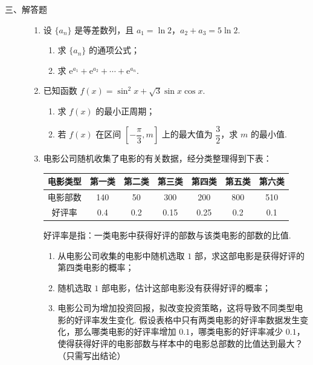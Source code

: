 \begin{description}

    \item[三、解答题]

    \begin{enumerate}[leftmargin=5pt]

      \addtocounter{enumi}{+14}

        \item 设 \(\{a_n\}\) 是等差数列，且 \(a_1=\ln2\)，\(a_2+a_3=5\ln2\).

\begin{enumerate}
\item 求 \(\{a_n\}\) 的通项公式；
\item 求 \({\mathrm{e}}^{a_1}+{\mathrm{e}}^{a_2}+\cdots+{\mathrm{e}}^{a_n}\).
\end{enumerate}

        \item 已知函数 \(f(x)=\sin^2x+\sqrt3\sin x\cos x\).

\begin{enumerate}
\item 求 \(f(x)\) 的最小正周期；
\item 若 \(f(x)\) 在区间 \(\left[-\dfrac\pi3,m\right]\) 上的最大值为 \(\dfrac32\)，求 \(m\) 的最小值.
\end{enumerate}

        \item 电影公司随机收集了电影的有关数据，经分类整理得到下表：

\begin{center}
\begin{tabular}{c|cccccc}
电影类型 & 第一类 & 第二类 & 第三类 & 第四类 & 第五类 & 第六类 \\
\hline
电影部数 & 140 & 50 & 300 & 200 & 800 & 510 \\
好评率 & 0.4 & 0.2 & 0.15 & 0.25 & 0.2 & 0.1
\end{tabular}
\end{center}

好评率是指：一类电影中获得好评的部数与该类电影的部数的比值.

\begin{enumerate}
\item 从电影公司收集的电影中随机选取 \(1\) 部，求这部电影是获得好评的第四类电影的概率；
\item 随机选取 \(1\) 部电影，估计这部电影没有获得好评的概率；
\item 电影公司为增加投资回报，拟改变投资策略，这将导致不同类型电影的好评率发生变化. 假设表格中只有两类电影的好评率数据发生变化，那么哪类电影的好评率增加 \(0.1\)，哪类电影的好评率减少 \(0.1\)，使得获得好评的电影部数与样本中的电影总部数的比值达到最大？（只需写出结论）
\end{enumerate}


\end{enumerate}
\end{description}
